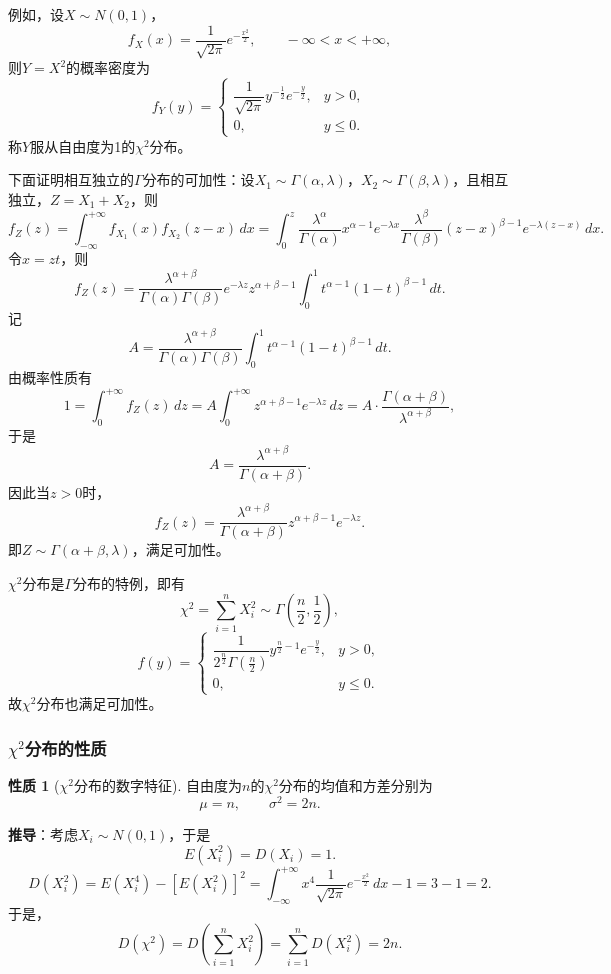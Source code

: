 \documentclass[11pt,a4paper]{report}
\theoremstyle{definition}
\newtheorem{property}{性质}[chapter]
\begin{document}
例如，设$X\sim N(0,1)$，
\[
f_{X}(x)=\frac{1}{\sqrt{2\pi}}e^{-\frac{x^{2}}{2}},\qquad -\infty<x<+\infty,
\]
则$Y=X^{2}$的概率密度为
\[
f_{Y}(y)=
\begin{cases}
\dfrac{1}{\sqrt{2\pi}}y^{-\frac{1}{2}}e^{-\frac{y}{2}}, & y>0,\\[0.5em]
0, & y\leq 0.
\end{cases}
\]
称$Y$服从自由度为1的$\chi^{2}$分布。

下面证明相互独立的$\Gamma$分布的可加性：设$X_{1}\sim\Gamma(\alpha,\lambda)$，$X_{2}\sim\Gamma(\beta,\lambda)$，且相互独立，$Z=X_{1}+X_{2}$，则
\[
f_{Z}(z)=\int_{-\infty}^{+\infty}f_{X_{1}}(x)f_{X_{2}}(z-x)\,dx=\int_{0}^{z}\frac{\lambda^{\alpha}}{\Gamma(\alpha)}x^{\alpha-1}e^{-\lambda x}\frac{\lambda^{\beta}}{\Gamma(\beta)}(z-x)^{\beta-1}e^{-\lambda(z-x)}\,dx.
\]
令$x=zt$，则
\[
f_{Z}(z)=\frac{\lambda^{\alpha+\beta}}{\Gamma(\alpha)\Gamma(\beta)}e^{-\lambda z}z^{\alpha+\beta-1}\int_{0}^{1}t^{\alpha-1}(1-t)^{\beta-1}\,dt.
\]
记
\[
A=\frac{\lambda^{\alpha+\beta}}{\Gamma(\alpha)\Gamma(\beta)}\int_{0}^{1}t^{\alpha-1}(1-t)^{\beta-1}\,dt.
\]
由概率性质有
\[
1=\int_{0}^{+\infty}f_{Z}(z)\,dz=A\int_{0}^{+\infty}z^{\alpha+\beta-1}e^{-\lambda z}\,dz=A\cdot\frac{\Gamma(\alpha+\beta)}{\lambda^{\alpha+\beta}},
\]
于是
\[
A=\frac{\lambda^{\alpha+\beta}}{\Gamma(\alpha+\beta)}.
\]
因此当$z>0$时，
\[
f_{Z}(z)=\frac{\lambda^{\alpha+\beta}}{\Gamma(\alpha+\beta)}z^{\alpha+\beta-1}e^{-\lambda z}.
\]
即$Z\sim\Gamma(\alpha+\beta,\lambda)$，满足可加性。

$\chi^{2}$分布是$\Gamma$分布的特例，即有
\[
\chi^{2}=\sum_{i=1}^{n}X_{i}^{2}\sim\Gamma\left(\frac{n}{2},\frac{1}{2}\right),
\]
\[
f(y)=
\begin{cases}
\dfrac{1}{2^{\frac{n}{2}}\Gamma\left(\frac{n}{2}\right)}y^{\frac{n}{2}-1}e^{-\frac{y}{2}}, & y>0,\\[0.5em]
0, & y\leq 0.
\end{cases}
\]
故$\chi^{2}$分布也满足可加性。

\subsubsection*{$\chi^{2}$分布的性质}

\begin{property}[$\chi^{2}$分布的数字特征]
自由度为$n$的$\chi^{2}$分布的均值和方差分别为
\[
\mu=n,\qquad\sigma^{2}=2n.
\]
\end{property}

\textbf{推导}：考虑$X_{i}\sim N(0,1)$，于是
\[
E\left(X_{i}^{2}\right)=D(X_{i})=1.
\]
\[
D\left(X_{i}^{2}\right)=E\left(X_{i}^{4}\right)-\left[E\left(X_{i}^{2}\right)\right]^{2}=\int_{-\infty}^{+\infty}x^{4}\frac{1}{\sqrt{2\pi}}e^{-\frac{x^{2}}{2}}\,dx-1=3-1=2.
\]
于是，
\[
D\left(\chi^{2}\right)=D\left(\sum_{i=1}^{n}X_{i}^{2}\right)=\sum_{i=1}^{n}D\left(X_{i}^{2}\right)=2n.
\]
\end{document}

